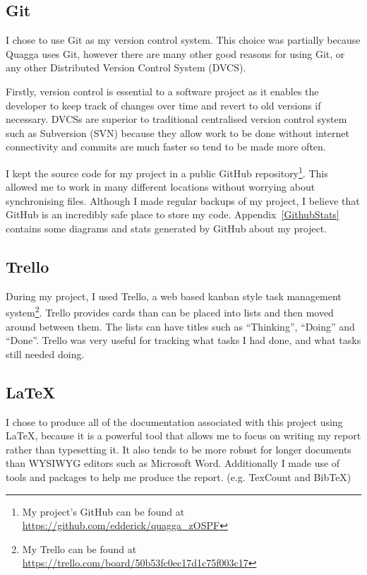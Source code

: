 \documentclass[12pt,a4paper,twoside]{report}
\begin{document}
\subsection{Git}
I chose to use Git as my version control system. This choice was
partially because Quagga uses Git, however there are many other good reasons for
using Git, or any other Distributed Version Control System (DVCS).

Firstly, version control is essential to a software project as it enables the
developer to keep track of changes over time and revert to old versions if
necessary. DVCSs are superior to traditional centralised version control
system such as Subversion (SVN) because they allow work to be done without internet
connectivity and commits are much faster so tend to be made more often. 

I kept the source code for my project in a public GitHub repository\footnote{My
project's GitHub can be found at
\url{https://github.com/edderick/quagga\_zOSPF}}. This allowed me to work in
many different locations without worrying about synchronising files. Although
I made regular backups of my project, I believe that GitHub is an incredibly
safe place to store my code. Appendix~\ref{GithubStats} contains some
diagrams and stats generated by GitHub about my project. 

\subsection{Trello}
During my project, I used Trello, a web based kanban style task
management system\footnote{My Trello can be found at
\url{https://trello.com/board/50b53fc0ec17d1c75f003c17}}.
Trello provides cards than can be placed into lists and then moved around
between them. The lists can have titles such as ``Thinking'', ``Doing'' and
``Done''. Trello was very useful for tracking what tasks I had done, and what
tasks still needed doing. 

\subsection{\LaTeX}
I chose to produce all of the documentation associated with this project using
\LaTeX, because it is a powerful tool that allows me to focus on writing my
report rather than typesetting it. It also tends to be more robust for longer
documents than WYSIWYG editors such as Microsoft Word. Additionally I made use
of tools and packages to help me produce the report. (e.g. TexCount and BibTeX)
\end{document}
